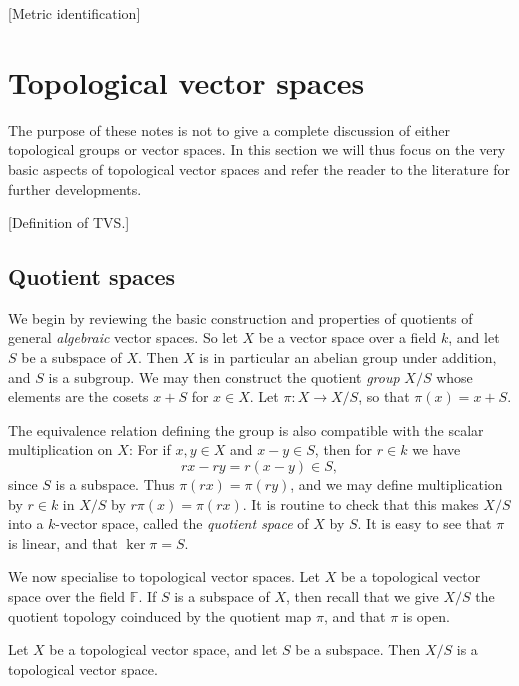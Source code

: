 \documentclass[article, a4paper, 11pt, oneside]{memoir}
\numberwithin{equation}{chapter}
\begin{document}
[Metric identification]


\chapter{Topological vector spaces}

The purpose of these notes is not to give a complete discussion of either topological groups or vector spaces. In this section we will thus focus on the very basic aspects of topological vector spaces and refer the reader to the literature for further developments.

[Definition of TVS.]

\section{Quotient spaces}

We begin by reviewing the basic construction and properties of quotients of general \emph{algebraic} vector spaces. So let $X$ be a vector space over a field $k$, and let $S$ be a subspace of $X$. Then $X$ is in particular an abelian group under addition, and $S$ is a subgroup. We may then construct the quotient \emph{group} $X/S$ whose elements are the cosets $x + S$ for $x \in X$. Let $\pi \colon X \to X/S$, so that $\pi(x) = x + S$.

The equivalence relation defining the group is also compatible with the scalar multiplication on $X$: For if $x,y \in X$ and $x - y \in S$, then for $r \in k$ we have
%
\begin{equation*}
    rx - ry
        = r(x - y) \in S,
\end{equation*}
%
since $S$ is a subspace. Thus $\pi(rx) = \pi(ry)$, and we may define multiplication by $r \in k$ in $X/S$ by $r \pi(x) = \pi(rx)$. It is routine to check that this makes $X/S$ into a $k$-vector space, called the \emph{quotient space} of $X$ by $S$. It is easy to see that $\pi$ is linear, and that $\ker \pi = S$.

\newcommand{\setF}{\mathbb{F}}

We now specialise to topological vector spaces. Let $X$ be a topological vector space over the field $\setF$. If $S$ is a subspace of $X$, then recall that we give $X/S$ the quotient topology coinduced by the quotient map $\pi$, and that $\pi$ is open.


\begin{theorem}
    Let $X$ be a topological vector space, and let $S$ be a subspace. Then $X/S$ is a topological vector space.
\end{theorem}
\end{document}
